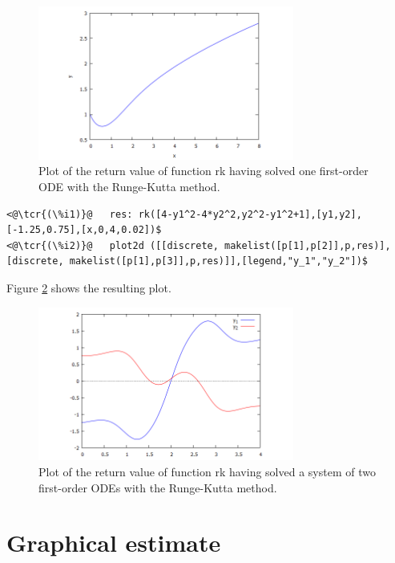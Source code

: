 \documentclass[../Maxima_Workbook.tex]{subfiles}
\begin{document}
\begin{figure}
	\centering
	\includegraphics[width=0.75\textwidth]{DE_rk1.png}
	\caption{Plot of the return value of function rk having solved one first-order ODE with the Runge-Kutta method.}
	\label{DE-Fig1}
\end{figure}

\lz \begin{small}
\color{blue}
\begin{lstlisting}
<@\tcr{(\%i1)}@   res: rk([4-y1^2-4*y2^2,y2^2-y1^2+1],[y1,y2],[-1.25,0.75],[x,0,4,0.02])$
<@\tcr{(\%i2)}@   plot2d ([[discrete, makelist([p[1],p[2]],p,res)],[discrete, makelist([p[1],p[3]],p,res)]],[legend,"y_1","y_2"])$
\end{lstlisting}
\color{black}
\end{small}

\lz Figure \ref{DE-Fig2} shows the resulting plot.

\begin{figure}
	\centering
	\includegraphics[width=0.75\textwidth]{DE_rk2.png}
	\caption{Plot of the return value of function rk having solved a system of two first-order ODEs with the Runge-Kutta method.}
	\label{DE-Fig2}
\end{figure}

\section{Graphical estimate}
\end{document}
